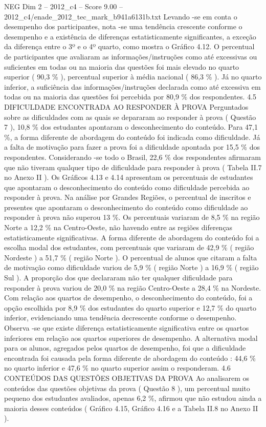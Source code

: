 \begin{textsample}{NEG Dim 2 – 2012\_c4 – Score 9.00 – 2012\_c4/enade\_2012\_tec\_mark\_b941a6131b.txt}
Levando -se em conta o desempenho dos participantes, nota -se uma tendência crescente conforme o desempenho e a existência de diferenças estatisticamente significantes, a exceção da diferença entre o 3º e o 4º quarto, como mostra o Gráfico 4.12.
O percentual de participantes que avaliaram as informações/instruções como até excessivas ou suficientes em todas ou na maioria das questões foi mais elevado no quarto superior ( 90,3 \% ), percentual superior à média nacional ( 86,3 \% ).
Já no quarto inferior, a suficiência das informações/instruções declarada como até excessiva em todas ou na maioria das questões foi percebida por 80,9 \% dos respondentes. 4.5 DIFICULDADE ENCONTRADA AO RESPONDER À PROVA Perguntados sobre as dificuldades com as quais se depararam ao responder à prova ( Questão 7 ), 10,8 \% dos estudantes apontaram o desconhecimento do conteúdo.
Para 47,1 \%, a forma diferente de abordagem do conteúdo foi indicada como dificuldade.
Já a falta de motivação para fazer a prova foi a dificuldade apontada por 15,5 \% dos respondentes.
Considerando -se todo o Brasil, 22,6 \% dos respondentes afirmaram que não tiveram qualquer tipo de dificuldade para responder à prova ( Tabela II.7 no Anexo II ).
Os Gráficos 4.13 e 4.14 apresentam os percentuais de estudantes que apontaram o desconhecimento do conteúdo como dificuldade percebida ao responder à prova.
Na análise por Grandes Regiões, o percentual de inscritos e presentes que apontaram o desconhecimento do conteúdo como dificuldade ao responder à prova não superou 13 \%.
Os percentuais variaram de 8,5 \% na região Norte a 12,2 \% na Centro-Oeste, não havendo entre as regiões diferenças estatisticamente significativas.
A forma diferente de abordagem do conteúdo foi a escolha modal dos estudantes, com percentuais que variaram de 42,9 \% ( região Nordeste ) a 51,7 \% ( região Norte ).
O percentual de alunos que citaram a falta de motivação como dificuldade variou de 5,9 \% ( região Norte ) a 16,9 \% ( região Sul ).
A proporção dos que declararam não ter qualquer dificuldade para responder à prova variou de 20,0 \% na região Centro-Oeste a 28,4 \% na Nordeste.
Com relação aos quartos de desempenho, o desconhecimento do conteúdo, foi a opção escolhida por 8,9 \% dos estudantes do quarto superior e 12,7 \% do quarto inferior, evidenciando uma tendência decrescente conforme o desempenho.
Observa -se que existe diferença estatisticamente significativa entre os quartos inferiores em relação aos quartos superiores de desempenho.
A alternativa modal para os alunos, agregados pelos quartos de desempenho, foi que a dificuldade encontrada foi causada pela forma diferente de abordagem do conteúdo : 44,6 \% no quarto inferior e 47,6 \% no quarto superior assim o responderam. 4.6 CONTEÚDOS DAS QUESTÕES OBJETIVAS DA PROVA Ao analisarem os conteúdos das questões objetivas da prova ( Questão 8 ), um percentual muito pequeno dos estudantes avaliados, apenas 6,2 \%, afirmou que não estudou ainda a maioria desses conteúdos ( Gráfico 4.15, Gráfico 4.16 e a Tabela II.8 no Anexo II ).

\end{textsample}
